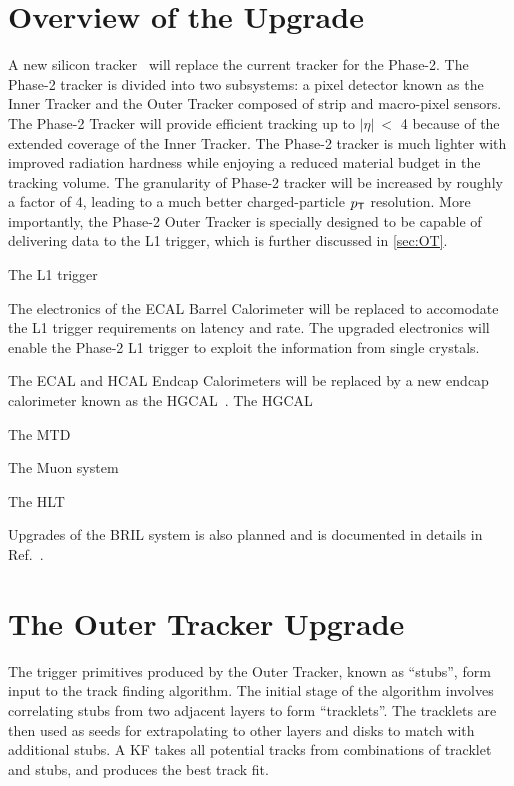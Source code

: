 \section{Overview of the Upgrade}
\label{sec:Overview}

A new silicon tracker~\cite{CMS:2017lum} will replace the current tracker for the Phase-2. The Phase-2 tracker is divided into two subsystems: a pixel detector known as the Inner Tracker and the Outer Tracker composed of strip and macro-pixel sensors. The Phase-2 Tracker will provide efficient tracking up to $|\eta|~<$ 4 because of the extended coverage of the Inner Tracker. The Phase-2 tracker is much lighter with improved radiation hardness while enjoying a reduced material budget in the tracking volume. The granularity of Phase-2 tracker will be increased by roughly a factor of 4, leading to a much better charged-particle $p_{\textsf{T}}$ resolution. More importantly, the Phase-2 Outer Tracker is specially designed to be capable of delivering data to the \ac{L1} trigger, which is further discussed in \autoref{sec:OT}.

The \ac{L1} trigger~\cite{Zabi:2020gjd}

The electronics of the \ac{ECAL} Barrel Calorimeter will be replaced to accomodate the \ac{L1} trigger requirements on latency and rate. The upgraded electronics will enable the Phase-2 \ac{L1} trigger to exploit the information from single crystals.

The \ac{ECAL} and \ac{HCAL} Endcap Calorimeters will be replaced by a new endcap calorimeter known as the \ac{HGCAL}~\cite{CMS:2017jpq}. The \ac{HGCAL}

The \ac{MTD}~\cite{Butler:2019rpu}

The Muon system~\cite{Hebbeker:2017bix}

The \ac{HLT} ~\cite{HLT:Upgrade}

Upgrades of the \ac{BRIL} system is also planned and is documented in details in Ref.~\cite{Beam:Upgrade}.

\section{The Outer Tracker Upgrade}
\label{sec:OT}

The trigger primitives produced by the Outer Tracker, known as ``stubs'', form input to the track finding algorithm. The initial stage of the algorithm involves correlating stubs from two adjacent layers to form ``tracklets''. The tracklets are then used as seeds for extrapolating to other layers and disks to match with additional stubs. A \ac{KF} takes all potential tracks from combinations of tracklet and stubs, and produces the best track fit.

